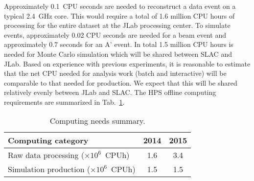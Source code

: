 Approximately 0.1~CPU seconds are needed to reconstruct a data event on 
a typical 2.4~GHz core. This would require a total of 1.6 million CPU hours of processing for the 
entire dataset at the JLab processing center.  To simulate events, approximately 0.02 CPU seconds 
are needed for a beam event and approximately 0.7 seconds for an A' event. In total 1.5 million CPU hours is needed for Monte Carlo 
simulation which will be shared between SLAC and JLab. 
Based on experience with previous experiments, it is reasonable to estimate that the net CPU needed for 
analysis work (batch and interactive) will be comparable to that needed for production. We expect 
that this will be shared relatively evenly between JLab and SLAC. The HPS offline computing requirements 
are summarized in Tab.~\ref{tab:computing}.
\begin{table}[tbp]
\centering
\begin{tabular}{|l|c|c|}
\hline
Computing category & 2014& 2015 \\
\hline
Raw data processing ($\times 10^{6}$~CPUh)  & 1.6 & 3.4 \\
Simulation production ($\times 10^{6}$~CPUh) & 1.5 & 1.5 \\
\hline
\end{tabular}
\caption{{\small Computing needs summary.}}
\label{tab:computing}
\end{table}
